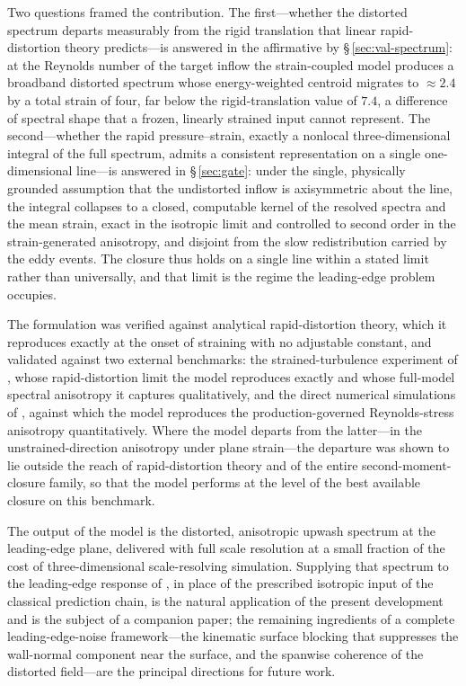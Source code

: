 \documentclass[lineno]{JFM-FLM_Au}
\newcounter{assumption}
\begin{document}
Two questions framed the contribution. The first---whether the distorted
spectrum departs measurably from the rigid translation that linear
rapid-distortion theory predicts---is answered in the affirmative by
\S\,\ref{sec:val-spectrum}: at the Reynolds number of the target inflow the
strain-coupled model produces a broadband distorted spectrum whose
energy-weighted centroid migrates to $\approx2.4$ by a total strain of four,
far below the rigid-translation value of $7.4$, a difference of spectral shape
that a frozen, linearly strained input cannot represent. The second---whether
the rapid pressure--strain, exactly a nonlocal three-dimensional integral of
the full spectrum, admits a consistent representation on a single
one-dimensional line---is answered in \S\,\ref{sec:gate}: under the single,
physically grounded assumption that the undistorted inflow is axisymmetric
about the line, the integral collapses to a closed, computable kernel of the
resolved spectra and the mean strain, exact in the isotropic limit and
controlled to second order in the strain-generated anisotropy, and disjoint
from the slow redistribution carried by the eddy events. The closure thus
holds on a single line within a stated limit rather than universally, and that
limit is the regime the leading-edge problem occupies.

The formulation was verified against analytical rapid-distortion theory, which
it reproduces exactly at the onset of straining with no adjustable constant,
and validated against two external benchmarks: the strained-turbulence
experiment of \citet{ChenMeneveauKatz2006}, whose rapid-distortion limit the
model reproduces exactly and whose full-model spectral anisotropy it captures
qualitatively, and the direct numerical simulations of \citet{LeeReynolds1985},
against which the model reproduces the production-governed Reynolds-stress
anisotropy quantitatively. Where the model departs from the latter---in the
unstrained-direction anisotropy under plane strain---the departure was shown to
lie outside the reach of rapid-distortion theory and of the entire
second-moment-closure family, so that the model performs at the level of the
best available closure on this benchmark.

The output of the model is the distorted, anisotropic upwash spectrum at the
leading-edge plane, delivered with full scale resolution at a small fraction of
the cost of three-dimensional scale-resolving simulation. Supplying that
spectrum to the leading-edge response of \citet{Amiet1975}, in place of the
prescribed isotropic input of the classical prediction chain, is the natural
application of the present development and is the subject of a companion paper;
the remaining ingredients of a complete leading-edge-noise framework---the
kinematic surface blocking that suppresses the wall-normal component near the
surface, and the spanwise coherence of the distorted field---are the principal
directions for future work.



\end{document}
